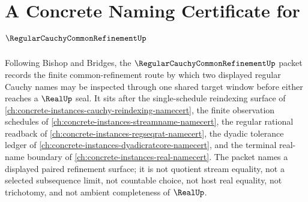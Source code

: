 \chapter{A Concrete Naming Certificate for $\RegularCauchyCommonRefinementUp$}
\label{ch:concrete-instances-regular-cauchy-common-refinement-namecert}

Following Bishop and Bridges, the $\RegularCauchyCommonRefinementUp$ packet records the finite common-refinement route by which two displayed regular Cauchy names may be inspected through one shared target window before either reaches a $\RealUp$ seal. It sits after the single-schedule reindexing surface of \autoref{ch:concrete-instances-cauchy-reindexing-namecert}, the finite observation schedules of \autoref{ch:concrete-instances-streamname-namecert}, the regular rational readback of \autoref{ch:concrete-instances-regseqrat-namecert}, the dyadic tolerance ledger of \autoref{ch:concrete-instances-dyadicratcore-namecert}, and the terminal real-name boundary of \autoref{ch:concrete-instances-real-namecert}. The packet names a displayed paired refinement surface; it is not quotient stream equality, not a selected subsequence limit, not countable choice, not host real equality, not trichotomy, and not ambient completeness of $\RealUp$.

